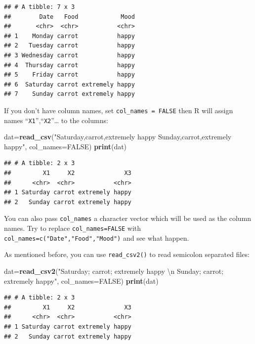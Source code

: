 \documentclass[12pt,]{krantz}
\newenvironment{Shaded}{\begin{snugshade}}{\end{snugshade}}
\newcommand{\KeywordTok}[1]{\textcolor[rgb]{0.13,0.29,0.53}{\textbf{{#1}}}}
\newcommand{\DataTypeTok}[1]{\textcolor[rgb]{0.13,0.29,0.53}{{#1}}}
\newcommand{\CharTok}[1]{\textcolor[rgb]{0.31,0.60,0.02}{{#1}}}
\newcommand{\StringTok}[1]{\textcolor[rgb]{0.31,0.60,0.02}{{#1}}}
\newcommand{\OtherTok}[1]{\textcolor[rgb]{0.56,0.35,0.01}{{#1}}}
\newcommand{\NormalTok}[1]{{#1}}
\theoremstyle{definition}
\theoremstyle{definition}
\theoremstyle{remark}
\begin{document}
\begin{verbatim}
## # A tibble: 7 x 3
##        Date   Food            Mood
##       <chr>  <chr>           <chr>
## 1    Monday carrot           happy
## 2   Tuesday carrot           happy
## 3 Wednesday carrot           happy
## 4  Thursday carrot           happy
## 5    Friday carrot           happy
## 6  Saturday carrot extremely happy
## 7    Sunday carrot extremely happy
\end{verbatim}

If you don't have column names, set \texttt{col\_names\ =\ FALSE} then R
will assign names ``\texttt{X1}'',``\texttt{X2}''\ldots{} to the
columns:

\begin{Shaded}
\begin{Highlighting}[]
\NormalTok{dat=}\KeywordTok{read_csv}\NormalTok{(}\StringTok{"Saturday,carrot,extremely happy}
\StringTok{          Sunday,carrot,extremely happy"}\NormalTok{, }\DataTypeTok{col_names=}\OtherTok{FALSE}\NormalTok{)}
\KeywordTok{print}\NormalTok{(dat)}
\end{Highlighting}
\end{Shaded}

\begin{verbatim}
## # A tibble: 2 x 3
##         X1     X2              X3
##      <chr>  <chr>           <chr>
## 1 Saturday carrot extremely happy
## 2   Sunday carrot extremely happy
\end{verbatim}

You can also pass \texttt{col\_names} a character vector which will be
used as the column names. Try to replace \texttt{col\_names=FALSE} with
\texttt{col\_names=c("Date","Food","Mood")} and see what happen.

As mentioned before, you can use \texttt{read\_csv2()} to read semicolon
separated files:

\begin{Shaded}
\begin{Highlighting}[]
\NormalTok{dat=}\KeywordTok{read_csv2}\NormalTok{(}\StringTok{"Saturday; carrot; extremely happy }\CharTok{\textbackslash{}n}\StringTok{ Sunday; carrot; extremely happy"}\NormalTok{, }\DataTypeTok{col_names=}\OtherTok{FALSE}\NormalTok{)}
\KeywordTok{print}\NormalTok{(dat)}
\end{Highlighting}
\end{Shaded}

\begin{verbatim}
## # A tibble: 2 x 3
##         X1     X2              X3
##      <chr>  <chr>           <chr>
## 1 Saturday carrot extremely happy
## 2   Sunday carrot extremely happy
\end{verbatim}
\end{document}
